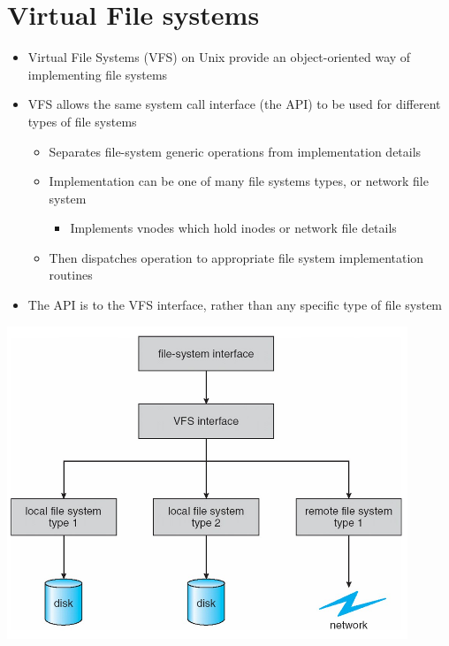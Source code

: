 \documentclass{article}[18pt]
\begin{document}
\section{Virtual File systems}
\begin{itemize}
	\item Virtual File Systems (VFS) on Unix provide an object-oriented way of implementing file systems
	\item VFS allows the same system call interface (the API) to be used for different types of file systems
	\begin{itemize}
		\item Separates file-system generic operations from implementation details
		\item Implementation can be one of many file systems types, or network file system
		\begin{itemize}
			\item Implements vnodes which hold inodes or network file details
		\end{itemize}
		\item Then dispatches operation to appropriate file system implementation routines
	\end{itemize}
	\item The API is to the VFS interface, rather than any specific type of file system
\end{itemize}
\begin{center}
	\includegraphics[scale=0.7]{VFS}
\end{center}
\end{document}
